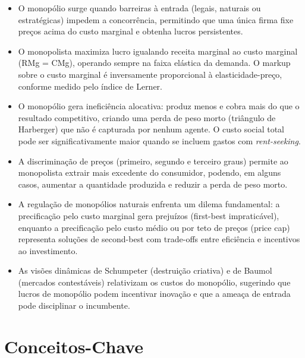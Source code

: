 \documentclass[11pt,twoside,openright]{book}
\providecommand{\tightlist}{\setlength{\itemsep}{0pt}\setlength{\parskip}{0pt}}
\begin{document}
\begin{itemize}
\tightlist
\item
  O monopólio surge quando barreiras à entrada (legais, naturais ou
  estratégicas) impedem a concorrência, permitindo que uma única firma
  fixe preços acima do custo marginal e obtenha lucros persistentes.
\item
  O monopolista maximiza lucro igualando receita marginal ao custo
  marginal (RMg = CMg), operando sempre na faixa elástica da demanda. O
  markup sobre o custo marginal é inversamente proporcional à
  elasticidade-preço, conforme medido pelo índice de Lerner.
\item
  O monopólio gera ineficiência alocativa: produz menos e cobra mais do
  que o resultado competitivo, criando uma perda de peso morto
  (triângulo de Harberger) que não é capturada por nenhum agente. O
  custo social total pode ser significativamente maior quando se incluem
  gastos com \emph{rent-seeking}.
\item
  A discriminação de preços (primeiro, segundo e terceiro graus) permite
  ao monopolista extrair mais excedente do consumidor, podendo, em
  alguns casos, aumentar a quantidade produzida e reduzir a perda de
  peso morto.
\item
  A regulação de monopólios naturais enfrenta um dilema fundamental: a
  precificação pelo custo marginal gera prejuízos (first-best
  impraticável), enquanto a precificação pelo custo médio ou por teto de
  preços (price cap) representa soluções de second-best com trade-offs
  entre eficiência e incentivos ao investimento.
\item
  As visões dinâmicas de Schumpeter (destruição criativa) e de Baumol
  (mercados contestáveis) relativizam os custos do monopólio, sugerindo
  que lucros de monopólio podem incentivar inovação e que a ameaça de
  entrada pode disciplinar o incumbente.
\end{itemize}

\section{Conceitos-Chave}\label{conceitos-chave-1}
\end{document}
